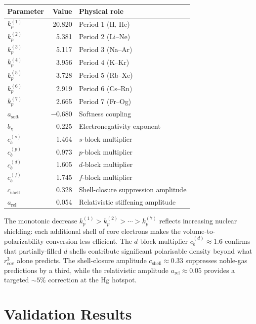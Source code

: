 \documentclass[11pt,letterpaper]{article}
\newcommand{\rcov}{r_{\mathrm{cov}}}
\newcommand{\kp}{k_p}
\newcommand{\cb}{c_b}
\newcommand{\asoft}{a_{\mathrm{soft}}}
\newcommand{\bchi}{b_\chi}
\begin{document}
\begin{center}
\begin{tabular}{lrl}
\toprule
\textbf{Parameter} & \textbf{Value} & \textbf{Physical role} \\
\midrule
$\kp^{(1)}$ & 20.820 & Period 1 (H, He) \\
$\kp^{(2)}$ &  5.381 & Period 2 (Li--Ne) \\
$\kp^{(3)}$ &  5.117 & Period 3 (Na--Ar) \\
$\kp^{(4)}$ &  3.956 & Period 4 (K--Kr) \\
$\kp^{(5)}$ &  3.728 & Period 5 (Rb--Xe) \\
$\kp^{(6)}$ &  2.919 & Period 6 (Cs--Rn) \\
$\kp^{(7)}$ &  2.665 & Period 7 (Fr--Og) \\[4pt]
$\asoft$     & $-0.680$ & Softness coupling \\
$\bchi$      &  0.225 & Electronegativity exponent \\[4pt]
$\cb^{(s)}$  &  1.464 & $s$-block multiplier \\
$\cb^{(p)}$  &  0.973 & $p$-block multiplier \\
$\cb^{(d)}$  &  1.605 & $d$-block multiplier \\
$\cb^{(f)}$  &  1.745 & $f$-block multiplier \\[4pt]
$c_{\text{shell}}$ & 0.328 & Shell-closure suppression amplitude \\
$a_{\text{rel}}$   & 0.054 & Relativistic stiffening amplitude \\
\bottomrule
\end{tabular}
\end{center}

\noindent The monotonic decrease $\kp^{(1)} > \kp^{(2)} > \cdots >
\kp^{(7)}$ reflects increasing nuclear shielding: each additional shell
of core electrons makes the volume-to-polarizability conversion less
efficient.  The $d$-block multiplier $\cb^{(d)} \approx 1.6$ confirms
that partially-filled $d$ shells contribute significant
polarisable density beyond what $\rcov^3$ alone predicts.
The shell-closure amplitude $c_{\text{shell}} \approx 0.33$ suppresses
noble-gas predictions by a third, while the relativistic amplitude
$a_{\text{rel}} \approx 0.05$ provides a targeted $\sim 5\%$ correction
at the Hg hotspot.

\section{Validation Results}
\label{sec:validation}
\end{document}
